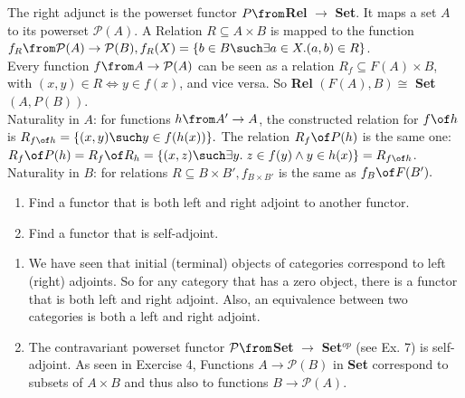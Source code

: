 	\begin{answer}
		The right adjunct is the powerset functor $P \from $\textbf{Rel }$ \to $ \textbf{ Set}. 
		It maps a set $A$ to its powerset $\mathcal{P}(A)$. 
		A Relation $R \subseteq A \times B$ is mapped to the function $f_R \from \mathcal{P}(A) \to \mathcal{P}(B), f_R(X) = \{b \in B \such \exists a \in X. (a,b) \in R \}$. 
		\\Every function $f \from A \to \mathcal{P}(A)$ can be seen as a relation $R_f \subseteq F(A) \times B$, with $(x,y) \in R \Leftrightarrow y \in f(x)$, and vice versa. 
		So \textbf{Rel }$(F(A), B) \cong $\textbf{ Set}$(A, P(B))$.\\
		Naturality in $A$: for functions $h \from A' \to A$,  the constructed relation for $f \of h$ is $R_{f \of h} = \{(x,y) \such  y \in f(h(x))\}.$ 
		The relation $R_f \of P(h)$ is the same one:  $R_f \of P(h)= R_f \of R_h = \{(x,z) \such \exists y. \; z \in f(y) \land y \in h(x)\} = R_{f \of h}$. 
		\\Naturality in $B$: for relations $R \subseteq B \times B', f_{B \times B'}$ is the same as $f_B \of F(B').$
	\end{answer}
	
	
	\begin{exercise}
		\begin{enumerate}
			\item Find a functor that is both left and right adjoint to another functor.
			\item Find a functor that is self-adjoint.
		\end{enumerate}
	\end{exercise}
	
	\begin{answer}
		\begin{enumerate}
			\item We have seen that initial (terminal) objects of categories correspond to left (right) adjoints. So for any category that has a zero object, there is a functor that is both left and right adjoint. Also, an equivalence between two categories is both a left and right adjoint.
			
			\item The contravariant powerset functor $\mathcal{P} \from $\textbf {Set }$ \to$\textbf{ Set}$^{op}$ (see Ex. 7) is self-adjoint. 
			As seen in Exercise 4, Functions $A \to \mathcal{P}(B)$ in \textbf{Set} correspond to subsets of $A \times B$ and thus also to functions $B \to \mathcal{P}(A)$.
		\end{enumerate}
	\end{answer}
	
